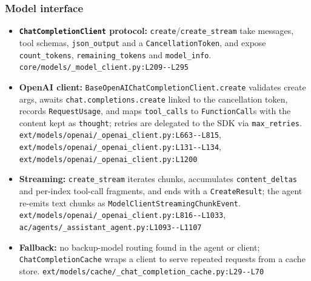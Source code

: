 \subsubsection*{Model interface}
\begin{itemize}
\item \textbf{\texttt{ChatCompletionClient} protocol:} \texttt{create}/\texttt{create\_\allowbreak{}stream} take messages, tool schemas, \texttt{json\_\allowbreak{}output} and a \texttt{CancellationToken}, and expose \texttt{count\_\allowbreak{}tokens}, \texttt{remaining\_\allowbreak{}tokens} and \texttt{model\_\allowbreak{}info}. \texttt{core/\allowbreak{}models/\allowbreak{}\_\allowbreak{}model\_\allowbreak{}client.\allowbreak{}py:\allowbreak{}L209-\allowbreak{}-\allowbreak{}L295}
\item \textbf{OpenAI client:} \texttt{BaseOpenAIChatCompletionClient.\allowbreak{}create} validates create args, awaits \texttt{chat.\allowbreak{}completions.\allowbreak{}create} linked to the cancellation token, records \texttt{RequestUsage}, and maps \texttt{tool\_\allowbreak{}calls} to \texttt{FunctionCall}s with the content kept as \texttt{thought}; retries are delegated to the SDK via \texttt{max\_\allowbreak{}retries}. \texttt{ext/\allowbreak{}models/\allowbreak{}openai/\allowbreak{}\_\allowbreak{}openai\_\allowbreak{}client.\allowbreak{}py:\allowbreak{}L663-\allowbreak{}-\allowbreak{}L815}, \texttt{ext/\allowbreak{}models/\allowbreak{}openai/\allowbreak{}\_\allowbreak{}openai\_\allowbreak{}client.\allowbreak{}py:\allowbreak{}L131-\allowbreak{}-\allowbreak{}L134}, \texttt{ext/\allowbreak{}models/\allowbreak{}openai/\allowbreak{}\_\allowbreak{}openai\_\allowbreak{}client.\allowbreak{}py:\allowbreak{}L1200}
\item \textbf{Streaming:} \texttt{create\_\allowbreak{}stream} iterates chunks, accumulates \texttt{content\_\allowbreak{}deltas} and per-index tool-call fragments, and ends with a \texttt{CreateResult}; the agent re-emits text chunks as \texttt{ModelClientStreamingChunkEvent}. \texttt{ext/\allowbreak{}models/\allowbreak{}openai/\allowbreak{}\_\allowbreak{}openai\_\allowbreak{}client.\allowbreak{}py:\allowbreak{}L816-\allowbreak{}-\allowbreak{}L1033}, \texttt{ac/\allowbreak{}agents/\allowbreak{}\_\allowbreak{}assistant\_\allowbreak{}agent.\allowbreak{}py:\allowbreak{}L1093-\allowbreak{}-\allowbreak{}L1107}
\item \textbf{Fallback:} no backup-model routing found in the agent or client; \texttt{ChatCompletionCache} wraps a client to serve repeated requests from a cache store. \texttt{ext/\allowbreak{}models/\allowbreak{}cache/\allowbreak{}\_\allowbreak{}chat\_\allowbreak{}completion\_\allowbreak{}cache.\allowbreak{}py:\allowbreak{}L29-\allowbreak{}-\allowbreak{}L70}
\end{itemize}

